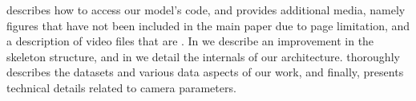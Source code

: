 \fi

\fi
  describes how to access our model's code, and  provides additional media, namely figures that have not been included in the main paper due to page limitation, and a description of video files that are \fi. In  we describe an improvement in the skeleton structure, and in  we detail the internals of our architecture.  thoroughly describes the datasets and various data aspects of our work, and finally,   presents technical details related to camera parameters.

\ifeccv
\vspace{18pt}
\fi


